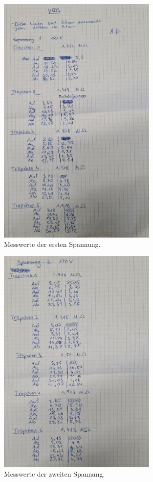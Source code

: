\begin{figure}
    \centering
    \includegraphics[width=0.7\textwidth]{bilder/Spannung1.jpg}
    \caption{Messwerte der ersten Spannung.}
\end{figure}

\begin{figure}
    \centering
    \includegraphics[width=0.7\textwidth]{bilder/Spannung2.jpg}
    \caption{Messwerte der zweiten Spannung.}
\end{figure}

